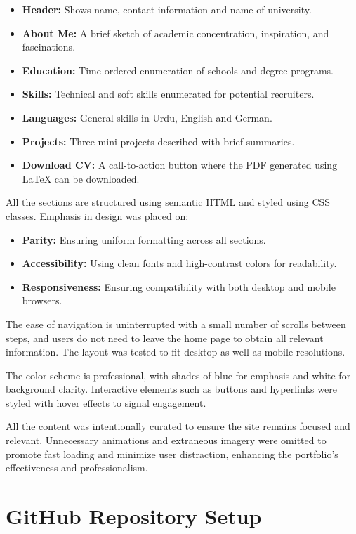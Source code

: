 \documentclass[11pt,a4paper]{article}
\begin{document}
\begin{itemize}
    \item \textbf{Header:} Shows name, contact information and name of university.
    \item \textbf{About Me:} A brief sketch of academic concentration, inspiration, and fascinations.
    \item \textbf{Education:} Time-ordered enumeration of schools and degree programs.
    \item \textbf{Skills:} Technical and soft skills enumerated for potential recruiters.
    \item \textbf{Languages:} General skills in Urdu, English and German.
    \item \textbf{Projects:} Three mini-projects described with brief summaries.
    \item \textbf{Download CV:} A call-to-action button where the PDF generated using LaTeX can be downloaded.
\end{itemize}

All the sections are structured using semantic HTML and styled using CSS classes. Emphasis in design was placed on:

\begin{itemize}
    \item \textbf{Parity:} Ensuring uniform formatting across all sections.
    \item \textbf{Accessibility:} Using clean fonts and high-contrast colors for readability.
    \item \textbf{Responsiveness:} Ensuring compatibility with both desktop and mobile browsers.
\end{itemize}

The ease of navigation is uninterrupted with a small number of scrolls between steps, and users do not need to leave the home page to obtain all relevant information. The layout was tested to fit desktop as well as mobile resolutions.

The color scheme is professional, with shades of blue for emphasis and white for background clarity. Interactive elements such as buttons and hyperlinks were styled with hover effects to signal engagement.

All the content was intentionally curated to ensure the site remains focused and relevant. Unnecessary animations and extraneous imagery were omitted to promote fast loading and minimize user distraction, enhancing the portfolio’s effectiveness and professionalism.

\section*{GitHub Repository Setup}
\end{document}
